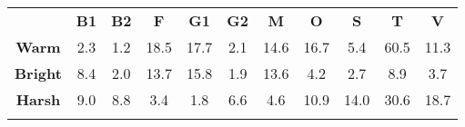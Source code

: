 \begin{tabular}{|c||c|c|c|c|c|c|c|c|c|c|}
	\cline{2-11}
	\multicolumn{1}{c|}{} & \bf{B1} & \bf{B2} & \bf{F} & \bf{G1} & \bf{G2} & \bf{M} & \bf{O} & \bf{S} & \bf{T} & \bf{V} \tabularnewline
	\hhline{~|-|-|-|-|-|-|-|-|-|-|}
	\noalign{\vspace{\doublerulesep}}
	\hhline{-||-|-|-|-|-|-|-|-|-|-|}
	\bf{Warm} &  2.3 &  1.2 & 18.5 & 17.7 &  2.1 & 14.6 & 16.7 &  5.4 & 60.5 & 11.3 \tabularnewline
	\hhline{-||-|-|-|-|-|-|-|-|-|-|}
	\bf{Bright} &  8.4 &  2.0 & 13.7 & 15.8 &  1.9 & 13.6 &  4.2 &  2.7 &  8.9 &  3.7 \tabularnewline
	\hhline{-||-|-|-|-|-|-|-|-|-|-|}
	\bf{Harsh} &  9.0 &  8.8 &  3.4 &  1.8 &  6.6 &  4.6 & 10.9 & 14.0 & 30.6 & 18.7 \tabularnewline
	\hhline{-||-|-|-|-|-|-|-|-|-|-|}
\end{tabular}
